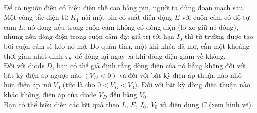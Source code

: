 \begin{vd}\\
    Để có nguồn điện có hiệu điện thế cao bằng pin, người ta dùng đoạn mạch sau.
    \\Một công tắc điện từ $K_1$ nối một pin có suất điện động $E$ với cuộn cảm có độ tự cảm $L$: nó đóng nếu trong cuộn cảm không có dòng điện (lò xo giữ nó đóng), nhưng nếu dòng điện trong cuộn cảm đạt giá trị tới hạn $I_0$ thì từ trường được tạo bởi cuộn cảm sẽ kéo nó mở. Do quán tính, một khi khóa đã mở, cần một khoảng thời gian nhất định $\tau_K$ để đóng lại ngay cả khi dòng điện giảm về không.
    \\Đối với diode $D$, bạn có thể giả định rằng dòng điện của nó bằng không đối với bất kỳ điện áp ngược nào $(V_D <0)$ và đối với bất kỳ điện áp thuận nào nhỏ hơn điện áp mở $V_0$ (tức là cho $0 <V_D <V_0)$. Đối với bất kỳ dòng điện thuận nào khác không, điện áp của diode $V_D$ đều bằng $V_0$.
    \\Bạn có thể biểu diễn các kết quả theo $L,~E,~I_0,~V_0$ và điện dung $C$ (xem hình vẽ).
    \begin{center}
        


\begin{tikzpicture}[x=0.75pt,y=0.75pt,yscale=-1,xscale=1]


\end{tikzpicture}
\end{center}
\end{vd}
